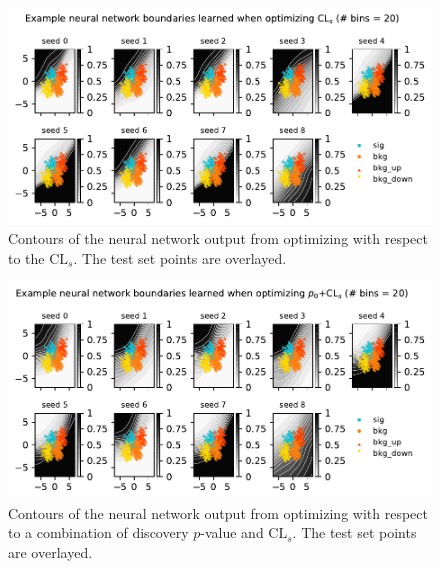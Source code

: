 \documentclass[
  11pt,
  numbers=noendperiod]{book}
\begin{document}
\begin{figure}

{\centering \includegraphics{./images/new-grid-models-CLs-20nobin (1).pdf}

}

\caption{\label{fig-grid-20bin-CLs}Contours of the neural network output
from optimizing with respect to the \(\mathrm{CL}_s\). The test set
points are overlayed.}

\end{figure}

\begin{figure}

{\centering \includegraphics{./images/new-grid-models-COMB-20nobin (1).pdf}

}

\caption{\label{fig-grid-20bin-comb}Contours of the neural network
output from optimizing with respect to a combination of discovery
\(p\)-value and \(\mathrm{CL}_s\). The test set points are overlayed.}

\end{figure}
\end{document}
